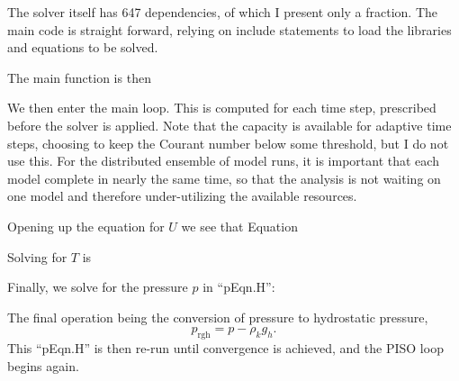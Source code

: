 The solver itself has 647 dependencies, of which I present only a fraction.
The main code is straight forward, relying on include statements to load the libraries and equations to be solved.



The main function is then



We then enter the main loop.
This is computed for each time step, prescribed before the solver is applied.
Note that the capacity is available for adaptive time steps, choosing to keep the Courant number below some threshold, but I do not use this.
For the distributed ensemble of model runs, it is important that each model complete in nearly the same time, so that the analysis is not waiting on one model and therefore under-utilizing the available resources.



Opening up the equation for $U$ we see that Equation



Solving for $T$ is 



Finally, we solve for the pressure $p$ in ``pEqn.H'':



The final operation being the conversion of pressure to hydrostatic pressure,
\begin{equation*} p _\text{rgh} = p - \rho _k g_h . \end{equation*}
This ``pEqn.H'' is then re-run until convergence is achieved, and the PISO loop begins again.

